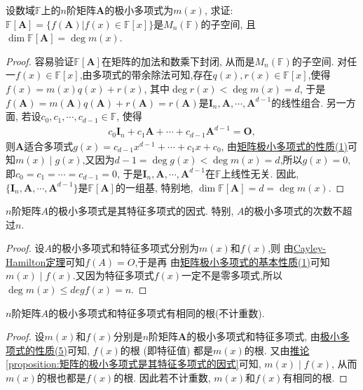 \documentclass[../../main.tex]{subfiles}
\begin{document}
\begin{proposition}\label{proposition:F[A]的维数等于A的极小多项式的次数}
设数域\(\mathbb{F}\)上的\(n\)阶矩阵\(\boldsymbol{A}\)的极小多项式为\(m(x)\), 求证: \(\mathbb{F}[\boldsymbol{A}] = \{f(\boldsymbol{A})|f(x)\in\mathbb{F}[x]\}\)是\(M_n(\mathbb{F})\)的子空间, 且\(\dim\mathbb{F}[\boldsymbol{A}] = \deg m(x)\).
\end{proposition}
\begin{proof}
容易验证\(\mathbb{F}[\boldsymbol{A}]\)在矩阵的加法和数乘下封闭, 从而是\(M_n(\mathbb{F})\)的子空间. 对任一\(f(x)\in\mathbb{F}[x]\),由多项式的带余除法可知,存在$q(x),r(x)\in \mathbb{F}[x]$,使得\(f(x) = m(x)q(x) + r(x)\), 其中\(\deg r(x)<\deg m(x) = d\), 于是\(f(\boldsymbol{A}) = m(\boldsymbol{A})q(\boldsymbol{A}) + r(\boldsymbol{A}) = r(\boldsymbol{A})\)是\(\boldsymbol{I}_n,\boldsymbol{A},\cdots,\boldsymbol{A}^{d - 1}\)的线性组合. 另一方面, 若设\(c_0,c_1,\cdots,c_{d - 1}\in\mathbb{F}\), 使得
\begin{align*}
c_0\boldsymbol{I}_n + c_1\boldsymbol{A}+\cdots + c_{d - 1}\boldsymbol{A}^{d - 1} = \boldsymbol{O},
\end{align*}
则\(\boldsymbol{A}\)适合多项式\(g(x) = c_{d - 1}x^{d - 1}+\cdots + c_1x + c_0\), 由\hyperref[proposition:极小多项式的性质]{矩阵极小多项式的性质(1)}可知$m(x)\mid g(x)$,又因为\(d-1=\deg g(x)<\deg m(x) = d\),所以\(g(x) = 0\), 即\(c_0 = c_1 = \cdots = c_{d - 1} = 0\), 于是\(\boldsymbol{I}_n,\boldsymbol{A},\cdots,\boldsymbol{A}^{d - 1}\)在\(\mathbb{F}\)上线性无关. 因此, \(\{\boldsymbol{I}_n,\boldsymbol{A},\cdots,\boldsymbol{A}^{d - 1}\}\)是\(\mathbb{F}[\boldsymbol{A}]\)的一组基, 特别地, \(\dim\mathbb{F}[\boldsymbol{A}] = d = \deg m(x)\). 
\end{proof}

\begin{proposition}\label{proposition:矩阵的极小多项式是其特征多项式的因式}
$n$阶矩阵$A$的极小多项式是其特征多项式的因式. 特别, $A$的极小多项式的次数不超过$n$.
\end{proposition}
\begin{proof}
设$A$的极小多项式和特征多项式分别为$m(x)$和$f(x)$,则
由\hyperref[theorem:Cayley-Hamilton定理]{Cayley-Hamilton定理}可知$f(A)=O$,于是再
由\hyperref[proposition:极小多项式的性质]{矩阵极小多项式的基本性质(1)}可知$m(x)\mid f(x)$.又因为特征多项式$f(x)$一定不是零多项式,所以$\deg m(x)\leq deg f(x)=n$.
\end{proof}

\begin{corollary}\label{corollary:极小多项式和特征多项式有相同的根(不计重数)}
$n$阶矩阵$A$的极小多项式和特征多项式有相同的根(不计重数).
\end{corollary}
\begin{proof}
设\(m(x)\)和\(f(x)\)分别是\(n\)阶矩阵\(\boldsymbol{A}\)的极小多项式和特征多项式,
由\hyperref[proposition:极小多项式的性质]{极小多项式的性质(5)}可知, \(f(x)\)的根 (即特征值) 都是\(m(x)\)的根. 又由\hyperref[proposition:矩阵的极小多项式是其特征多项式的因式]{推论\ref{proposition:矩阵的极小多项式是其特征多项式的因式}}可知, \(m(x)\mid f(x)\), 从而\(m(x)\)的根也都是\(f(x)\)的根. 因此若不计重数, \(m(x)\)和\(f(x)\)有相同的根. 
\end{proof}
\end{document}
